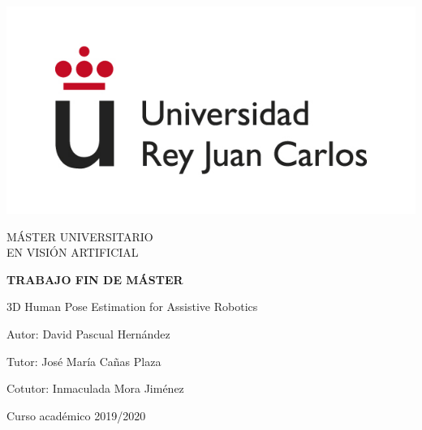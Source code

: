 \begin{titlepage}
	
	\begin{center}
		\vspace*{7.7mm}
		\begin{center}
			\includegraphics[width=0.4\linewidth]{figures/logo.jpg}
		\end{center}
		\vspace{6.5mm}
		
		\fontsize{14}{14}\selectfont MÁSTER UNIVERSITARIO \\ EN VISIÓN ARTIFICIAL

		\vspace{70pt}
		
		\fontsize{15.7}{14}\selectfont \textbf{TRABAJO FIN DE MÁSTER} 
		
		\vspace{25mm}
		\begin{huge}
			 3D Human Pose Estimation \vspace{20pt} for Assistive Robotics
		\end{huge}
		
		\vspace{25mm}
		
		\begin{large}
			Autor: David Pascual Hernández
			
			Tutor: José María Cañas Plaza
			
			Cotutor: Inmaculada Mora Jiménez 
			
			\vspace{10mm}
		\end{large}
		\begin{normalsize}
			Curso académico 2019/2020
		\end{normalsize}
		\vspace{10mm}
		
	\end{center}
	
\end{titlepage}

\pagebreak
\thispagestyle{empty}
\vspace*{12cm}

